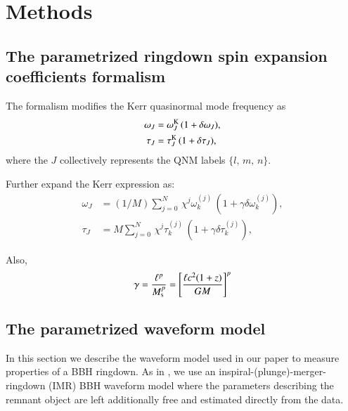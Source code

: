 \documentclass[twocolumn,
               prd,
               aps,
               superscriptaddress,
               tightenlines,
               nofootinbib,
               eqsecnum,
               amsfonts,
               amsmath,
               longbibliography]{revtex4-1}
\newcommand{\hs}[1]{{\textcolor{blue}{{[HS: #1]}} }}
\begin{document}
\section{Methods}
\label{sec:method}

\subsection{The parametrized ringdown spin expansion coefficients formalism}
\label{sec:review_parspec}


The formalism modifies the Kerr quasinormal mode frequency as
%
\begin{subequations}
\begin{align}
\omega_{J} &= \omega^{\rm K}_{J} \, (1 + \delta \omega_{J}), \\
\tau_{J}   &= \tau^{\rm K}_{J}   \, (1 + \delta \tau_{J}),
\end{align}
\label{eq:general_deviation}
\end{subequations}
%
where the $J$ collectively represents the QNM labels $\{l,\, m,\, n\}$.

Further expand the Kerr expression as:
%
\begin{subequations}
\begin{align}
\omega_{J} &= (1/M) \sum_{j = 0}^{N} \, \chi^{j} \omega^{(j)}_{k} \, \left( 1 + \gamma \delta \omega^{(j)}_{k} \right), \\
\tau_{J}   &= M     \sum_{j = 0}^{N} \, \chi^{j} \tau^{(j)}_{k}   \, \left( 1 + \gamma \delta \tau^{(j)}_{k} \right),
\end{align}
\label{eq:kerr_expansion}
\end{subequations}

Also,
%
\begin{equation}
\gamma
%
= \frac{\ell^{p}}{M_{\rm s}^{p}}
%
= \left[
\frac{\ell c^2 (1 + z)}{G M}
\right]^{p}
\label{eq:def_gamma}
\end{equation}

\subsection{The parametrized waveform model}
\label{sec:review_pSEOB}

In this section we describe the waveform model used in our paper to measure properties of a BBH ringdown. As in \cite{Brito:2018rfr,Ghosh:2021mrv}, we use an inspiral-(plunge)-merger-ringdown (IMR) BBH waveform model where the parameters describing the remnant object are left additionally free and estimated directly from the data.
\end{document}
